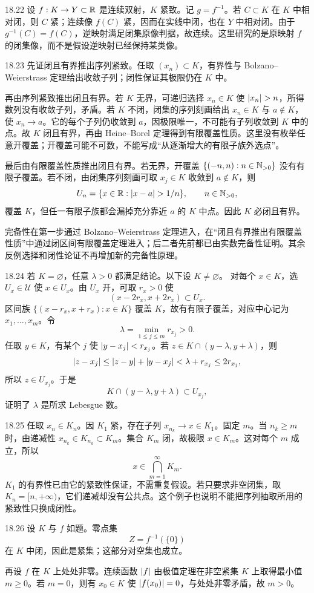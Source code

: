 \begin{solution}{18.22}
设 \(f:K\to Y\subset\mathbb{R}\) 是连续双射，\(K\) 紧致。记 \(g=f^{-1}\)。若 \(C\subset K\) 在 \(K\) 中相对闭，则 \(C\) 紧；连续像 \(f(C)\) 紧，因而在实线中闭，也在 \(Y\) 中相对闭。由于 \(g^{-1}(C)=f(C)\)，逆映射满足闭集原像判据，故连续。这里研究的是原映射 \(f\) 的闭集像，而不是假设逆映射已经保持某类像。
\end{solution}

\begin{solution}{18.23}
先证闭且有界推出序列紧致。任取 \((x_n)\subset K\)，有界性与 Bolzano--Weierstrass 定理给出收敛子列；闭性保证其极限仍在 \(K\) 中。

再由序列紧致推出闭且有界。若 \(K\) 无界，可递归选择 \(x_n\in K\) 使 \(\abs{x_n}>n\)，所得数列没有收敛子列，矛盾。若 \(K\) 不闭，闭集的序列刻画给出 \(x_n\in K\) 与 \(a\notin K\)，使 \(x_n\to a\)。它的每个子列仍收敛到 \(a\)，因极限唯一，不可能有子列收敛到 \(K\) 中的点。故 \(K\) 闭且有界，再由 Heine--Borel 定理得到有限覆盖性质。这里没有枚举任意开覆盖；开覆盖可能不可数，不能写成“从逐渐增大的有限子族外选点”。

最后由有限覆盖性质推出闭且有界。若无界，开覆盖 \(\{(-n,n):n\in\mathbb{N}_{>0}\}\) 没有有限子覆盖。若不闭，由闭集序列刻画可取 \(x_j\in K\) 收敛到 \(a\notin K\)，则
\[
 U_n=\{x\in\R:\abs{x-a}>1/n\},\qquad n\in\Npos,
\]
覆盖 \(K\)，但任一有限子族都会漏掉充分靠近 \(a\) 的 \(K\) 中点。因此 \(K\) 必闭且有界。

完备性在第一步通过 Bolzano--Weierstrass 定理进入，在“闭且有界推出有限覆盖性质”中通过闭区间有限覆盖定理进入；后二者先前都已由实数完备性证明。其余反例选择和闭性论证不再增加新的完备性原理。
\end{solution}

\begin{solution}{18.24}
若 \(K=\varnothing\)，任意 \(\lambda>0\) 都满足结论。以下设 \(K\ne\varnothing\)。
对每个 \(x\in K\)，选 \(U_x\in\mathcal U\) 使 \(x\in U_x\)。由 \(U_x\) 开，可取 \(r_x>0\) 使
\[
 (x-2r_x,x+2r_x)\subset U_x.
\]
区间族 \(\{(x-r_x,x+r_x):x\in K\}\) 覆盖 \(K\)，故有有限子覆盖，对应中心记为 \(x_1,\ldots,x_m\)。令
\[
 \lambda=\min_{1\le j\le m}r_{x_j}>0.
\]
任取 \(y\in K\)，有某个 \(j\) 使 \(\left|y-x_j\right|<r_{x_j}\)。若 \(z\in K\cap(y-\lambda,y+\lambda)\)，则
\[
 \left|z-x_j\right|
 \le\left|z-y\right|+\left|y-x_j\right|
 <\lambda+r_{x_j}
 \le2r_{x_j},
\]
所以 \(z\in U_{x_j}\)。于是
\[
 K\cap(y-\lambda,y+\lambda)\subset U_{x_j},
\]
证明了 \(\lambda\) 是所求 Lebesgue 数。
\end{solution}

\begin{solution}{18.25}
任取 \(x_n\in K_n\)。因 \(K_1\) 紧，存在子列 \(x_{n_k}\to x\in K_1\)。固定 \(m\)。当 \(n_k\ge m\) 时，由递减性 \(x_{n_k}\in K_{n_k}\subset K_m\)。集合 \(K_m\) 闭，故极限 \(x\in K_m\)。这对每个 \(m\) 成立，所以
\[
 x\in\bigcap_{m=1}^{\infty}K_m.
\]
\(K_1\) 的有界性已由它的紧致性保证，不需重复假设。若只要求非空闭集，取 \(K_n=[n,+\infty)\)，它们递减却没有公共点。这个例子也说明不能把序列抽取所用的紧致性只换成闭性。
\end{solution}

\begin{solution}{18.26}
设 \(K\) 与 \(f\) 如题。零点集
\[
 Z=f^{-1}(\{0\})
\]
在 \(K\) 中闭，因此是紧集；这部分对空集也成立。

再设 \(f\) 在 \(K\) 上处处非零。连续函数 \(\left|f\right|\) 由极值定理在非空紧集 \(K\) 上取得最小值 \(m\ge0\)。若 \(m=0\)，则有 \(x_0\in K\) 使 \(\left|f(x_0)\right|=0\)，与处处非零矛盾，故 \(m>0\)。
\end{solution}
